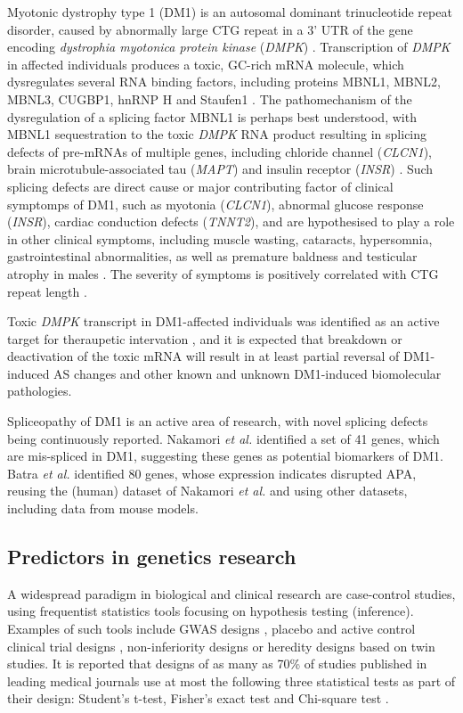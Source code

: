 \documentclass[10pt,letterpaper]{article}
\begin{document}
Myotonic dystrophy type 1 (DM1) is an autosomal dominant trinucleotide repeat disorder, caused by abnormally large CTG repeat in a 3' UTR of the gene encoding {\it dystrophia myotonica protein kinase} ({\it DMPK}) \cite{Brook1992}. Transcription of {\it DMPK} in affected individuals produces a toxic, GC-rich mRNA molecule, which dysregulates several RNA binding factors, including proteins MBNL1, MBNL2, MBNL3, CUGBP1, hnRNP H and Staufen1 \cite{Meola2015}. The pathomechanism of the dysregulation of a splicing factor MBNL1 is perhaps best understood, with MBNL1 sequestration to the toxic {\it DMPK} RNA product resulting in splicing defects of pre-mRNAs of multiple genes, including chloride channel ({\it CLCN1}), brain microtubule-associated
tau ({\it MAPT}) and insulin receptor ({\it INSR}) \cite{Holt2009}. Such splicing defects are direct cause or major contributing factor of clinical symptomps of DM1, such as myotonia ({\it CLCN1}), abnormal glucose response ({\it INSR}), cardiac conduction defects ({\it TNNT2}), and are hypothesised to play a role in other clinical symptoms, including muscle wasting, cataracts, hypersomnia, gastrointestinal abnormalities, as well as premature baldness and testicular atrophy in males \cite{Meola2015} \cite{Udd2012}. The severity of symptoms is positively correlated with CTG repeat length \cite{Meola2015}.

Toxic {\it DMPK} transcript in DM1-affected individuals was identified as an active target for theraupetic intervation \cite{Pandey2015}, and it is expected that breakdown or deactivation of the toxic mRNA will result in at least partial reversal of DM1-induced AS changes and other known and unknown DM1-induced biomolecular pathologies.

Spliceopathy of DM1 is an active area of research, with novel splicing defects being continuously reported. Nakamori {\it et al.} \cite{Nakamori2013} identified a set of 41 genes, which are mis-spliced in DM1, suggesting these genes as potential biomarkers of DM1. Batra {\it et al.} \cite{Batra2014} identified 80 genes, whose expression indicates disrupted APA, reusing the (human) dataset of Nakamori {\it et al.} and using other datasets, including data from mouse models.

\subsection*{Predictors in genetics research}

A widespread paradigm in biological and clinical research are case-control studies, using frequentist statistics tools focusing on hypothesis testing (inference). Examples of such tools include GWAS designs \cite{Bush2012}, placebo and active control clinical trial designs \cite{Brody2016}, non-inferiority designs \cite{DAgostino2002} or heredity designs based on twin studies. It is reported that designs of as many as 70\%  of studies published in leading medical journals use at most the following three statistical tests as part of their design: Student's t-test, Fisher's exact test and Chi-square test \cite{Prel2010}.
\end{document}
